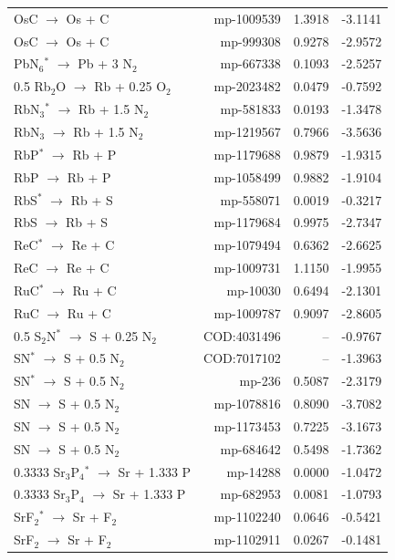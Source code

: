 \begin{longtable}{@{}lrrr@{}}
OsC $\rightarrow$ Os + C & mp-1009539 & 1.3918 & -3.1141 \\
OsC $\rightarrow$ Os + C & mp-999308 & 0.9278 & -2.9572 \\
PbN$_{6}$$^*$ $\rightarrow$ Pb + 3 N$_{2}$ & mp-667338 & 0.1093 & -2.5257 \\
0.5 Rb$_{2}$O $\rightarrow$ Rb + 0.25 O$_{2}$ & mp-2023482 & 0.0479 & -0.7592 \\
RbN$_{3}$$^*$ $\rightarrow$ Rb + 1.5 N$_{2}$ & mp-581833 & 0.0193 & -1.3478 \\
RbN$_{3}$ $\rightarrow$ Rb + 1.5 N$_{2}$ & mp-1219567 & 0.7966 & -3.5636 \\
RbP$^*$ $\rightarrow$ Rb + P & mp-1179688 & 0.9879 & -1.9315 \\
RbP $\rightarrow$ Rb + P & mp-1058499 & 0.9882 & -1.9104 \\
RbS$^*$ $\rightarrow$ Rb + S & mp-558071 & 0.0019 & -0.3217 \\
RbS $\rightarrow$ Rb + S & mp-1179684 & 0.9975 & -2.7347 \\
ReC$^*$ $\rightarrow$ Re + C & mp-1079494 & 0.6362 & -2.6625 \\
ReC $\rightarrow$ Re + C & mp-1009731 & 1.1150 & -1.9955 \\
RuC$^*$ $\rightarrow$ Ru + C & mp-10030 & 0.6494 & -2.1301 \\
RuC $\rightarrow$ Ru + C & mp-1009787 & 0.9097 & -2.8605 \\
0.5 S$_{2}$N$^*$ $\rightarrow$ S + 0.25 N$_{2}$ & COD:4031496 & -- & -0.9767 \\
SN$^*$ $\rightarrow$ S + 0.5 N$_{2}$ & COD:7017102 & -- & -1.3963 \\
SN$^*$ $\rightarrow$ S + 0.5 N$_{2}$ & mp-236 & 0.5087 & -2.3179 \\
SN $\rightarrow$ S + 0.5 N$_{2}$ & mp-1078816 & 0.8090 & -3.7082 \\
SN $\rightarrow$ S + 0.5 N$_{2}$ & mp-1173453 & 0.7225 & -3.1673 \\
SN $\rightarrow$ S + 0.5 N$_{2}$ & mp-684642 & 0.5498 & -1.7362 \\
0.3333 Sr$_{3}$P$_{4}$$^*$ $\rightarrow$ Sr + 1.333 P & mp-14288 & 0.0000 & -1.0472 \\
0.3333 Sr$_{3}$P$_{4}$ $\rightarrow$ Sr + 1.333 P & mp-682953 & 0.0081 & -1.0793 \\
SrF$_{2}$$^*$ $\rightarrow$ Sr + F$_{2}$ & mp-1102240 & 0.0646 & -0.5421 \\
SrF$_{2}$ $\rightarrow$ Sr + F$_{2}$ & mp-1102911 & 0.0267 & -0.1481 \\

\end{longtable}
